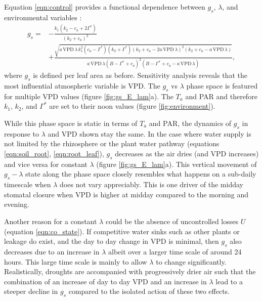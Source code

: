 \documentclass[utf8]{frontiersSCNS} %
\begin{document}
Equation \ref{eqn:control} provides a functional dependence between $g_s$, $\lambda$, and environmental variables \citep{katul_stomatal_2009}:
\begin{equation}
    \label{eqn:gs_vs_env_lambda}
    \begin{split}
        g_s = & - \frac{k_1 (k_2-c_a+2 \Gamma^*)}{(k_2+c_a)^2} \\
        & +\frac{\sqrt{a\, \text{VPD}\, \lambda\, k_1^2 (c_a-\Gamma^*)(k_2+\Gamma^*)(k_2+c_a-2 a\, \text{VPD}\, \lambda)^2(k_2+c_a-a\, \text{VPD}\, \lambda)}}{a\, \text{VPD}\, \lambda (B - \Gamma^* +c_a)^2(B - \Gamma^* +c_a-a\, \text{VPD}\, \lambda)} ,
    \end{split}
\end{equation}
where $g_s$ is defined per leaf area as before. Sensitivity analysis reveals that the most influential atmospheric variable is VPD. The $g_s$ vs $\lambda$ phase space is featured for multiple VPD values (figure \ref{fig:gs_E_lam}a).  The $T_a$ and PAR and therefore $k_1$, $k_2$, and $\Gamma^*$ are set to their noon values (figure \ref{fig:environment}).

While this phase space is static in terms of $T_a$ and PAR, the dynamics of $g_s$ in response to $\lambda$ and VPD shown stay the same. In the case where water supply is not limited by the rhizosphere or the plant water pathway (equations \ref{eqn:soil_root}, \ref{eqn:root_leaf}), $g_s$ decreases as the air dries (and VPD increases) and vice versa for constant $\lambda$ (figure \ref{fig:gs_E_lam}a). This vertical movement of $g_s-\lambda$ state along the phase space closely resembles what happens on a sub-daily timescale when $\lambda$ does not vary appreciably. This is one driver of the midday stomatal closure when VPD is higher at midday compared to the morning and evening.

Another reason for a constant $\lambda$ could be the absence of uncontrolled losses $U$ (equation \ref{eqn:co_state}). If competitive water sinks such as other plants or leakage do exist, and the day to day change in VPD is minimal, then $g_s$ also decreases due to an increase in $\lambda$ albeit over a larger time scale of around 24 hours. This large time scale is mainly to allow $\lambda$ to change significantly. Realistically, droughts are accompanied with progressively drier air such that the combination of an increase of day to day VPD and an increase in $\lambda$ lead to a steeper decline in $g_s$ compared to the isolated action of these two effects.
\end{document}
